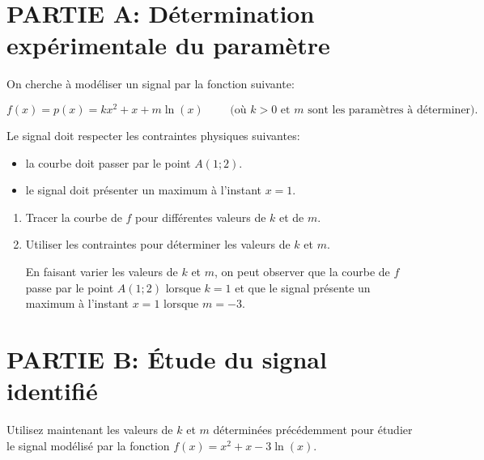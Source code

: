 \documentclass[11pt, a4paper]{report}
\begin{document}
\def\level{BTS}  %
\def\course{CIEL 1}
\def\chaptername{Intégration} %
\def\docname{C107 -- TP4}        %

\pagestyle{DS_FP}

\NomPrenomNote{}

\section*{PARTIE A: Détermination expérimentale du paramètre}

On cherche à modéliser un signal par la fonction suivante:  

\[f(x) =  p(x) = kx^2 + x + m\ln(x) \qquad \text{ (où $k>0$ et $m$ sont les paramètres à déterminer).}\]

Le signal doit respecter les contraintes physiques suivantes:

\begin{itemize}
    \item la courbe doit passer par le point $A(1;2)$.
    \item le signal doit présenter un maximum à l'instant $x=1$.
\end{itemize}

\begin{enumerate}
    \item Tracer la courbe de $f$ pour différentes valeurs de $k$ et de $m$. 
    \item Utiliser les contraintes pour déterminer les valeurs de $k$ et $m$. 
    \begin{blocvisible}[height=2]
        En faisant varier les valeurs de $k $ et $m$, on peut observer que la courbe de $f$ passe par le point $A(1;2)$ lorsque $k=1$ et que le signal présente un maximum à l'instant $x=1$ lorsque $m=-3$.
    \end{blocvisible}
\end{enumerate}



\section*{PARTIE B: Étude du signal identifié}

Utilisez maintenant les valeurs de $k$ et $m$ déterminées précédemment pour étudier le signal modélisé par la fonction $f(x) = x^2 + x - 3\ln(x)$.
\end{document}
